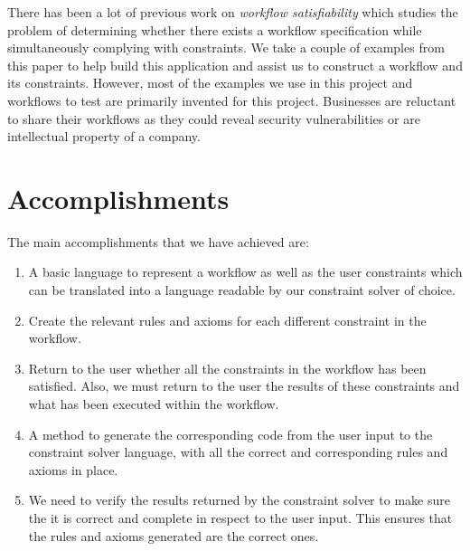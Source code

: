 \documentclass[a4paper]{report}
\begin{document}
There has been a lot of previous work on \textit{workflow satisfiability} \cite{seniority} which studies the problem of determining whether there exists a workflow specification while simultaneously complying with constraints. We take a couple of examples from this paper to help build this application and assist us to construct a workflow and its constraints. However, most of the examples we use in this project and workflows to test are primarily invented for this project. Businesses are reluctant to share their workflows as they could reveal security vulnerabilities or are intellectual property of a company.\\

\section{Accomplishments}
The main accomplishments that we have achieved are:
\begin{enumerate}
\item A basic language to represent a workflow as well as the user constraints which can be translated into a language readable by our constraint solver of choice.
\item Create the relevant rules and axioms for each different constraint in the workflow.
\item Return to the user whether all the constraints in the workflow has been satisfied. Also, we must return to the user the results of these constraints and what has been executed within the workflow.
\item A method to generate the corresponding code from the user input to the constraint solver language, with all the correct and corresponding rules and axioms in place. 
\item We need to verify the results returned by the constraint solver to make sure the it is correct and complete in respect to the user input. This ensures that the rules and axioms generated are the correct ones. 
\end{enumerate}
\end{document}
